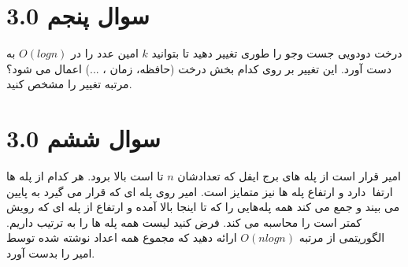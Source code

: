 \documentclass[12pt]{article}
\begin{document}
\section{سوال پنجم 3.0}
درخت دودویی جست وجو را طوری تغییر دهید تا بتوانید $k$ امین عدد را در $O(logn)$ به دست آورد. این تغییر بر روی کدام بخش درخت (حافظه، زمان ، ...) اعمال می شود؟ مرتبه تغییر را مشخص کنید.

\section{سوال ششم 3.0}
امیر قرار است از پله های برج ایفل که تعدادشان $n$ تا است بالا برود. هر کدام از پلە ها ارتفاعͬ دارد و ارتفاع پلە ها نیز متمایز است. امیر روی پلە ای که قرار می گیرد به پایین می بیند و جمع می کند همه پلەهایی را که تا اینجا بالا آمده و ارتفاع از پلە ای که رویش کمتر است را محاسبه می کند. فرض کنید لیست همه پلە ها را به ترتیب داریم. الگوریتمی از مرتبه $O(nlogn)$ ارائه دهید که مجموع همه اعداد نوشته شده توسط امیر را بدست آورد.
\end{document}
